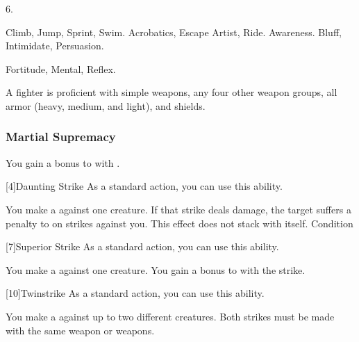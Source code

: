          6.

         Climb, Jump, Sprint, Swim.
         Acrobatics, Escape Artist, Ride.
         Awareness.
         Bluff, Intimidate, Persuasion.

          Fortitude,  Mental,  Reflex.

        A fighter is proficient with simple weapons, any four other weapon groups,  all armor (heavy, medium, and light), and shields.


        \subsubsection{Martial Supremacy}
             You gain a  bonus to  with .

            [4]{Daunting Strike} As a standard action, you can use this ability.
            \begin{ability}
                \begin{spelleffects}
                    \spelleffect You make a  against one creature.
                    If that strike deals damage, the target suffers a  penalty to  on strikes against you.
                    This effect does not stack with itself.
                    \spelldur Condition
                \end{spelleffects}
            \end{ability}

            [7]{Superior Strike} As a standard action, you can use this ability.
            \begin{ability}
                \begin{spelleffects}
                    \spelleffect You make a  against one creature.
                    You gain a  bonus to  with the strike.
                \end{spelleffects}
            \end{ability}

            [10]{Twinstrike} As a standard action, you can use this ability.
            \begin{ability}
                \begin{spelleffects}
                    \spelleffect You make a  against up to two different creatures.
                    Both strikes must be made with the same weapon or weapons.
                \end{spelleffects}
            \end{ability}


